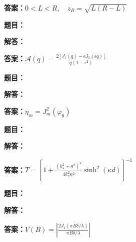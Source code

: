 \documentclass[lang=cn,color=blue,11pt]{elegantbook}
\begin{document}
\par\noindent\textbf{答案：}\(\displaystyle 0<L<R,\quad z_R=\sqrt{L(R-L)}\)\par
\par\smallskip\noindent\hrulefill\par\medskip
{}\par
\noindent\textbf{题目：}
\par\noindent\textbf{解答：}
\par\noindent\textbf{答案：}\(\displaystyle \mathcal A(q)=\frac{2[J_1(q)-\epsilon J_1(\epsilon q)]}{q(1-\epsilon^2)}\)\par
\par\smallskip\noindent\hrulefill\par\medskip
{}\par
\noindent\textbf{题目：}
\par\noindent\textbf{解答：}
\par\noindent\textbf{答案：}\(\displaystyle \eta_m=J_m^2(\varphi_0)\)\par
\par\smallskip\noindent\hrulefill\par\medskip
{}\par
\noindent\textbf{题目：}
\par\noindent\textbf{解答：}
\par\noindent\textbf{答案：}\(\displaystyle T=\left[1+\frac{(k_z^2+\kappa^2)^2}{4k_z^2\kappa^2}\sinh^2(\kappa d)\right]^{-1}\)\par
\par\smallskip\noindent\hrulefill\par\medskip
{}\par
\noindent\textbf{题目：}
\par\noindent\textbf{解答：}
\par\noindent\textbf{答案：}\(\displaystyle V(B)=\left|\frac{2J_1(\pi B\delta/\lambda)}{\pi B\delta/\lambda}\right|\)\par
\end{document}
